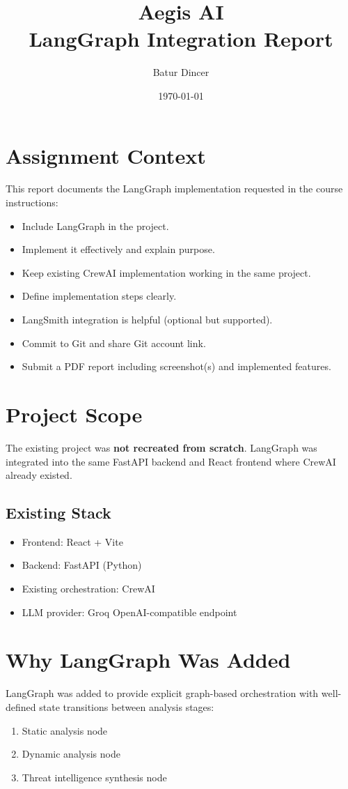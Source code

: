 \documentclass[11pt,a4paper]{article}
\title{Aegis AI\\LangGraph Integration Report}
\author{Batur Dincer}
\date{\today}
\begin{document}
\maketitle

\section{Assignment Context}
This report documents the LangGraph implementation requested in the course instructions:
\begin{itemize}[leftmargin=1.25em]
  \item Include LangGraph in the project.
  \item Implement it effectively and explain purpose.
  \item Keep existing CrewAI implementation working in the same project.
  \item Define implementation steps clearly.
  \item LangSmith integration is helpful (optional but supported).
  \item Commit to Git and share Git account link.
  \item Submit a PDF report including screenshot(s) and implemented features.
\end{itemize}

\section{Project Scope}
The existing project was \textbf{not recreated from scratch}. LangGraph was integrated into the same FastAPI backend and React frontend where CrewAI already existed.

\subsection*{Existing Stack}
\begin{itemize}[leftmargin=1.25em]
  \item Frontend: React + Vite
  \item Backend: FastAPI (Python)
  \item Existing orchestration: CrewAI
  \item LLM provider: Groq OpenAI-compatible endpoint
\end{itemize}

\section{Why LangGraph Was Added}
LangGraph was added to provide explicit graph-based orchestration with well-defined state transitions between analysis stages:
\begin{enumerate}[leftmargin=1.5em]
  \item Static analysis node
  \item Dynamic analysis node
  \item Threat intelligence synthesis node
\end{enumerate}
\end{document}
